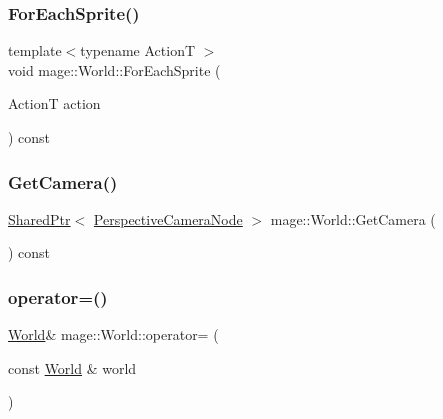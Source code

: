 \hypertarget{classmage_1_1_world_aa81817e1ebc34170d255e2efef1f3134}{}\label{classmage_1_1_world_aa81817e1ebc34170d255e2efef1f3134} 
\subsubsection{\texorpdfstring{For\+Each\+Sprite()}{ForEachSprite()}}
{\footnotesize\ttfamily template$<$typename ActionT $>$ \\
void mage\+::\+World\+::\+For\+Each\+Sprite (\begin{DoxyParamCaption}\item[{ActionT}]{action }\end{DoxyParamCaption}) const\hspace{0.3cm}{\ttfamily [private]}}

\hypertarget{classmage_1_1_world_a1bbfa8f45b8e262fda28f1bfb53128b7}{}\label{classmage_1_1_world_a1bbfa8f45b8e262fda28f1bfb53128b7} 
\subsubsection{\texorpdfstring{Get\+Camera()}{GetCamera()}}
{\footnotesize\ttfamily \hyperlink{namespacemage_a1e01ae66713838a7a67d30e44c67703e}{Shared\+Ptr}$<$ \hyperlink{namespacemage_a4542f24699be53c2f30040ce575155a7}{Perspective\+Camera\+Node} $>$ mage\+::\+World\+::\+Get\+Camera (\begin{DoxyParamCaption}{ }\end{DoxyParamCaption}) const}

\hypertarget{classmage_1_1_world_aa7074e3847c9fbe1466aa833f194eed0}{}\label{classmage_1_1_world_aa7074e3847c9fbe1466aa833f194eed0} 
\subsubsection{\texorpdfstring{operator=()}{operator=()}\hspace{0.1cm}{\footnotesize\ttfamily [1/2]}}
{\footnotesize\ttfamily \hyperlink{classmage_1_1_world}{World}\& mage\+::\+World\+::operator= (\begin{DoxyParamCaption}\item[{const \hyperlink{classmage_1_1_world}{World} \&}]{world }\end{DoxyParamCaption})\hspace{0.3cm}{\ttfamily [delete]}}

